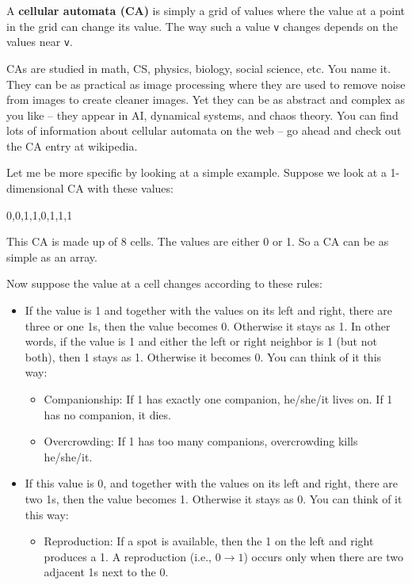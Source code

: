 \newpage{}

A \textbf{cellular automata (CA)} is simply a grid of values where the value at a point in the grid can change its value. The way such a value \verb!v! changes depends on the values near \verb!v!.

CAs are studied in math, CS, physics, biology, social science, etc. You name it. They can be as practical as image processing where they are used to remove noise from images to create cleaner images. Yet they can be as abstract and complex as you like -- they appear in AI, dynamical systems, and chaos theory. You can find lots of information about cellular automata on the web -- go ahead and check out the CA entry at wikipedia.

Let me be more specific by looking at a simple example. Suppose we look at a 1-dimensional CA with these values:
\begin{center}
0,0,1,1,0,1,1,1
\end{center}
This CA is made up of 8 cells. The values are either 0 or 1. So a CA can be as simple as an array.

Now suppose the value at a cell changes according to these rules:

\begin{itemize}
\item
  If the value is 1 and together with the values on its left and right,
  there are three or one 1s, then the value becomes 0. Otherwise it
  stays as 1. In other words, if the value is 1 and either the left or
  right neighbor is 1 (but not both), then 1 stays as 1. Otherwise it
  becomes 0. You can think of it this way:

  \begin{itemize}
  \item
    Companionship: If 1 has exactly one companion, he/she/it lives on.
    If 1 has no companion, it dies.
  \item
    Overcrowding: If 1 has too many companions, overcrowding kills
    he/she/it.
  \end{itemize}
\item
  If this value is 0, and together with the values on its left and
  right, there are two 1s, then the value becomes 1. Otherwise it stays
  as 0. You can think of it this way:

  \begin{itemize}
  \item
    Reproduction: If a spot is available, then the 1 on the left and
    right produces a 1. A reproduction (i.e., $0 \rightarrow 1$) occurs only when
    there are two adjacent 1s next to the 0.
  \end{itemize}
\end{itemize}

